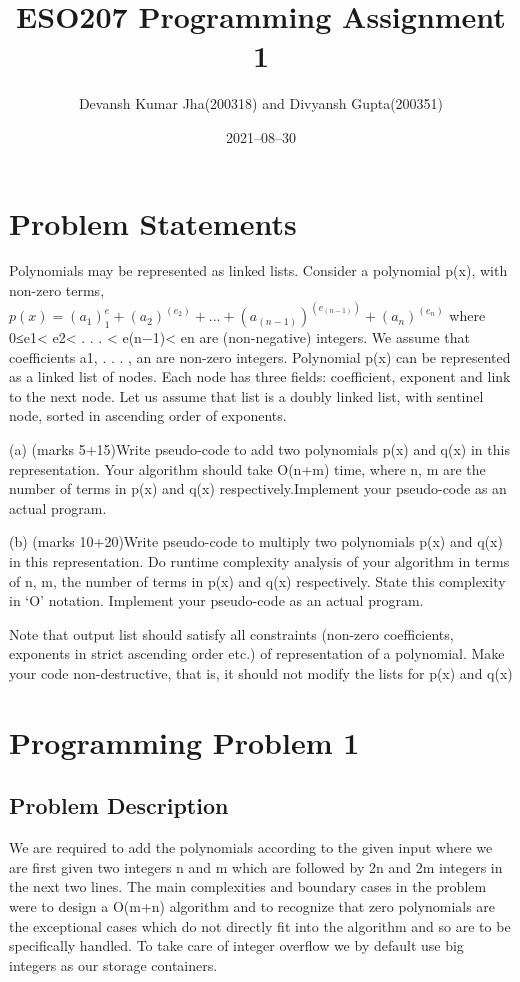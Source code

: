 \documentclass[20pt]{article}
\title{ESO207 Programming Assignment 1}
\author{Devansh Kumar Jha(200318) and Divyansh Gupta(200351)}
\date{2021–08–30}
\begin{document}
\maketitle

\section{Problem Statements}

Polynomials may be represented as linked lists.  Consider a polynomial {p(x)},  with non-zero terms, $p(x) =(a_1)^e_1+(a_2)^(e_2)+. . .+(a_(n−1))^(e_(n−1))+(a_n)^(e_n)$ 
where {0≤e1< e2< . . . < e(n−1)< en} are (non-negative) integers.  We assume that coefficients  {a1, . . . , an} are non-zero integers. Polynomial {p(x)} can be represented as a linked list of nodes.  Each node has three fields:  coefficient, exponent and link to the next node.  Let us assume that list is a doubly linked list, with sentinel node, sorted in ascending order of exponents.

(a) (marks 5+15)Write pseudo-code to add two polynomials {p(x) and q(x)} in this representation.  Your algorithm should take {O(n+m)} time, where {n, m} are the number of terms in {p(x) and q(x)} respectively.Implement your pseudo-code as an actual program.

(b) (marks 10+20)Write  pseudo-code  to  multiply  two  polynomials p(x)  and q(x)  in  this representation.   Do  runtime  complexity  analysis  of  your  algorithm  in  terms  of {n, m},  the number of terms in {p(x) and q(x)} respectively.  State this complexity in ‘O’ notation. Implement your pseudo-code as an actual program.

Note  that  output  list  should  satisfy  all  constraints  (non-zero  coefficients,  exponents  in  strict ascending order etc.)  of representation of a polynomial.  Make your code non-destructive, that is, it should not modify the lists for {p(x) and q(x)}

\newpage
\section{Programming Problem 1}

\subsection{Problem Description}
We are required to add the polynomials according to the given input where we are first given two integers n and m which are followed by {2n} and {2m} integers in the next two lines.
The main complexities and boundary cases in the problem were to design a {O(m+n)} algorithm and to recognize that zero polynomials are the exceptional cases which do not directly fit into the algorithm and so are to be specifically handled. To take care of integer overflow we by default use big integers as our storage containers.
\end{document}
